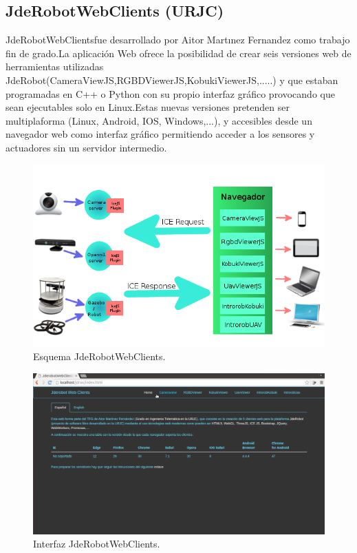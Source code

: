 \subsection*{JdeRobotWebClients (URJC)}
JdeRobotWebClients\cite{TFGJdeRobotWebClients}\cite{JdeRobotWebClients}fue desarrollado por Aitor Martınez Fernandez como trabajo fin de grado.La aplicación Web ofrece la posibilidad de crear seis versiones web de herramientas utilizadas JdeRobot(CameraViewJS,RGBDViewerJS,KobukiViewerJS,.....) y que estaban programadas en C++ o Python con su propio interfaz gráfico provocando que sean ejecutables solo en Linux.Estas nuevas versiones pretenden ser multiplaforma (Linux, Android, IOS, Windows,...), y accesibles desde un navegador web como interfaz gráfico permitiendo acceder a los sensores y actuadores sin un servidor intermedio.
\begin{figure}[!h]
\centering
\includegraphics[width=0.5\linewidth]{Figures/Aitor_esq_proyecto}
\decoRule
\caption[Esquema JdeRobotWebClients]{Esquema JdeRobotWebClients.}
\label{fig:Aitor_esq_proyecto}
\end{figure}
\begin{figure}[!h]
\centering
\includegraphics[width=0.5\linewidth]{Figures/Aitor_esquema_web}
\decoRule
\caption[Interfaz JdeRobotWebClients]{Interfaz JdeRobotWebClients.}
\label{fig:Aitor_esquema_web}
\end{figure}
